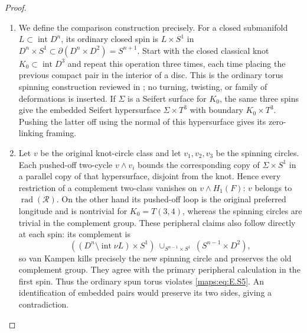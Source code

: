 \begin{proof}
\begin{enumerate}[label=\arabic*.,leftmargin=*]
\item We define the comparison construction precisely. For a closed
submanifold $L\subset\operatorname{int}D^n$, its ordinary closed
spin is $L\times S^1$ in
$D^n\times S^1\subset\partial(D^n\times D^2)=S^{n+1}$.
Start with the closed classical knot $K_0\subset\operatorname{int}D^3$
and repeat this operation three times, each time placing the
previous compact pair in the interior of a disc. This is the
ordinary torus spinning construction reviewed in
\cite[Section 3, immediately before Theorem 3.4]{mapsWinter08};
no turning, twisting, or family of deformations is inserted.
If $\Sigma$ is a Seifert surface for $K_0$, the same three spins
give the embedded Seifert hypersurface
$\Sigma\times T^3$ with boundary $K_0\times T^3$.
Pushing the latter off using the normal of this hypersurface
gives its zero-linking framing.

\item Let $v$ be the original knot-circle class and let $v_1,v_2,v_3$
be the spinning circles. Each pushed-off two-cycle $v\wedge v_i$
bounds the corresponding copy of $\Sigma\times S^1$ in a parallel
copy of that hypersurface, disjoint from the knot. Hence every
restriction of a complement two-class vanishes on $v\wedge H_1(F)$:
$v$ belongs to $\operatorname{rad}(\mathcal R)$.
On the other hand its pushed-off loop is the original preferred
longitude and is nontrivial for $K_0=T(3,4)$, whereas the spinning
circles are trivial in the complement group. These peripheral
claims also follow directly at each spin: its complement is
\[
 ((D^n\setminus\operatorname{int}\nu L)\times S^1)
       \ \cup_{S^{n-1}\times S^1}\ (S^{n-1}\times D^2),
\]
so van Kampen kills precisely the new spinning circle and preserves
the old complement group. They agree with the primary peripheral
calculation \cite[Theorem 4.5]{mapsWinter08} in the first spin.
Thus the ordinary spun torus violates \eqref{maps:eq:E.S5}. An identification
of embedded pairs would preserve its two sides, giving a
contradiction.


\end{enumerate}
\end{proof}
